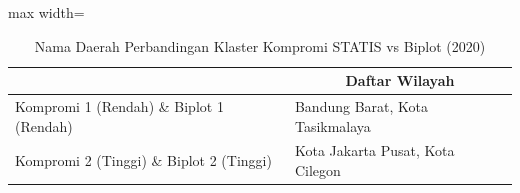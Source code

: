 \begin{table}[H]
\centering
\caption{Nama Daerah Perbandingan Klaster Kompromi STATIS vs Biplot (2020)} \label{tab:sample1biplot_comp_name_2020}
\begin{adjustbox}{max width=\textwidth}
\begin{tabular}{|>{\centering\arraybackslash}p{4cm}|p{10cm}|}
\hline
\multicolumn{1}{|c|}{\textbf{Kategori}} & \multicolumn{1}{c|}{\textbf{Daftar Wilayah}} \\
\hline
Kompromi 1 (Rendah) \& Biplot 1 (Rendah) & Bandung Barat, Kota Tasikmalaya \\
\hline
Kompromi 2 (Tinggi) \& Biplot 2 (Tinggi) & Kota Jakarta Pusat, Kota Cilegon \\
\hline
\end{tabular}
\end{adjustbox}
\end{table}